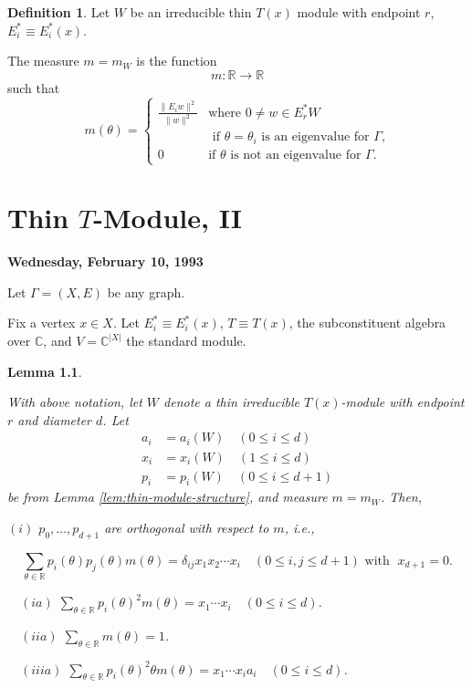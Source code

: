 \documentclass[
]{book}
\newtheorem{lemma}{Lemma}[chapter]
\theoremstyle{definition}
\newtheorem{definition}{Definition}[chapter]
\theoremstyle{definition}
\theoremstyle{definition}
\theoremstyle{definition}
\theoremstyle{remark}
\begin{document}
\begin{definition}
\protect\hypertarget{def:measure}{}\label{def:measure}Let \(W\) be an irreducible thin \(T(x)\) module with endpoint \(r\), \(E^*_i \equiv E_i^*(x)\).

The measure  \(m = m_W\) is the function
\[m: \mathbb{R} \to \mathbb{R}\]
such that
\[
m(\theta) = \begin{cases}\frac{\|E_iw\|^2}{\|w\|^2} & \text{where } 0\neq w \in E^*_rW\\
& \text{ if $\theta = \theta_i$ is an eigenvalue for $\Gamma$,}\\
0 & \text{if $\theta$ is not an eigenvalue for $\Gamma$.}
\end{cases}\]
\end{definition}

\hypertarget{lec10}{%
\chapter{\texorpdfstring{Thin \(T\)-Module, II}{Thin T-Module, II}}\label{lec10}}

\textbf{Wednesday, February 10, 1993}

Let \(\Gamma = (X, E)\) be any graph.

Fix a vertex \(x\in X\). Let \(E^*_i \equiv E^*_i(x)\), \(T\equiv T(x)\), the subconstituent algebra over \(\mathbb{C}\), and \(V = \mathbb{C}^{|X|}\) the standard module.

\begin{lemma}
\protect\hypertarget{lem:orthogonality}{}\label{lem:orthogonality}

With above notation, let \(W\) denote a thin irreducible \(T(x)\)-module with endpoint \(r\) and diameter \(d\). Let
\begin{align}
a_i & = a_i(W) \quad (0\leq i \leq d)\\
x_i & = x_i(W) \quad (1\leq i \leq d)\\
p_i & = p_i(W) \quad (0\leq i \leq d+1)
\end{align}
be from Lemma \ref{lem:thin-module-structure}, and measure \(m = m_W\).
Then,

\((i)\) \(p_0, \ldots, p_{d+1}\) are orthogonal with respect to \(m\), i.e.,

\[\sum_{\theta\in \mathbb{R}}p_i(\theta)p_j(\theta)m(\theta) = \delta_{ij}x_1x_2\cdots x_i \quad (0\leq i,j\leq d+1) \text{ with }\; x_{d+1}=0.\]

\(\quad (ia)\) \({\displaystyle \sum_{\theta\in \mathbb{R}}p_i(\theta)^2m(\theta) = x_1\cdots x_i \quad (0\leq i\leq d)}\).

\(\quad (iia)\) \({\displaystyle \sum_{\theta\in \mathbb{R}}m(\theta) = 1}\).

\(\quad (iiia)\) \({\displaystyle \sum_{\theta\in \mathbb{R}}p_i(\theta)^2\theta m(\theta) = x_1\cdots x_ia_i \quad (0\leq i\leq d)}\).

\end{lemma}
\end{document}
